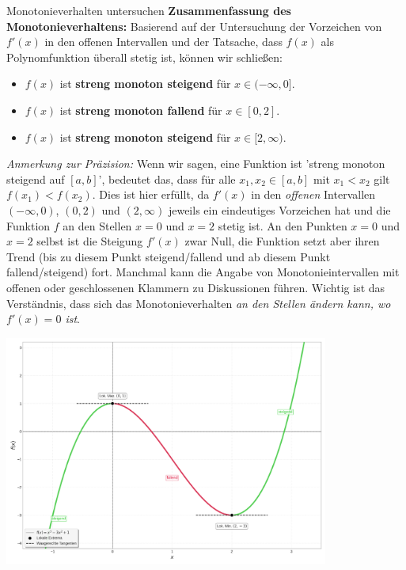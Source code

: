 \begin{beispielumgebung}{Monotonieverhalten untersuchen}
\textbf{Zusammenfassung des Monotonieverhaltens:}
Basierend auf der Untersuchung der Vorzeichen von $f'(x)$ in den offenen Intervallen und der Tatsache, dass $f(x)$ als Polynomfunktion überall stetig ist, können wir schließen:
\begin{itemize}
    \item $f(x)$ ist \textbf{streng monoton steigend} für $x \in (-\infty, 0]$.
    \item $f(x)$ ist \textbf{streng monoton fallend} für $x \in [0, 2]$.
    \item $f(x)$ ist \textbf{streng monoton steigend} für $x \in [2, \infty)$.
\end{itemize}
\textit{Anmerkung zur Präzision:} Wenn wir sagen, eine Funktion ist 'streng monoton steigend auf $[a,b]$', bedeutet das, dass für alle $x_1, x_2 \in [a,b]$ mit $x_1 < x_2$ gilt $f(x_1) < f(x_2)$. Dies ist hier erfüllt, da $f'(x)$ in den \textit{offenen} Intervallen $(-\infty,0)$, $(0,2)$ und $(2,\infty)$ jeweils ein eindeutiges Vorzeichen hat und die Funktion $f$ an den Stellen $x=0$ und $x=2$ stetig ist. An den Punkten $x=0$ und $x=2$ selbst ist die Steigung $f'(x)$ zwar Null, die Funktion setzt aber ihren Trend (bis zu diesem Punkt steigend/fallend und ab diesem Punkt fallend/steigend) fort. Manchmal kann die Angabe von Monotonieintervallen mit offenen oder geschlossenen Klammern zu Diskussionen führen. Wichtig ist das Verständnis, dass sich das Monotonieverhalten \textit{an den Stellen ändern kann, wo $f'(x)=0$ ist}.


\begin{center}
    \includegraphics[width=0.8\textwidth]{grafiken/Monotonie_Polynom3Grades.png}
    \label{fig:monotonie_bsp}
\end{center}

\end{beispielumgebung}

